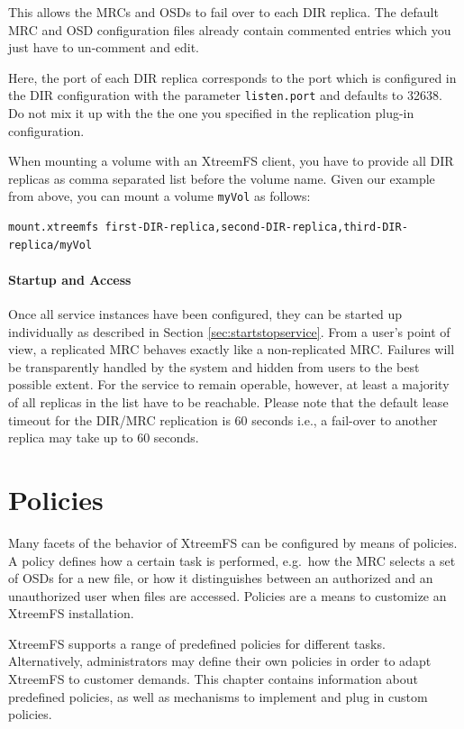 \documentclass[a4paper,10pt]{book}
\begin{document}
This allows the MRCs and OSDs to fail over to each DIR replica. The default MRC and OSD configuration files already contain commented entries which you just have to un-comment and edit.

Here, the port of each DIR replica corresponds to the port which is configured in the DIR configuration with the parameter \texttt{listen.port} and defaults to 32638. Do not mix it up with the the one you specified in the replication plug-in configuration.

When mounting a volume with an XtreemFS client, you have to provide all DIR replicas as comma separated list before the volume name. Given our example from above, you can mount a volume \texttt{myVol} as follows:

\begin{verbatim}
mount.xtreemfs first-DIR-replica,second-DIR-replica,third-DIR-replica/myVol
\end{verbatim}

\subsubsection{Startup and Access}
Once all service instances have been configured, they can be started up individually as described in Section \ref{sec:startstopservice}. From a user's point of view, a replicated MRC behaves exactly like a non-replicated MRC. Failures will be transparently handled by the system and hidden from users to the best possible extent. For the service to remain operable, however, at least a majority of all replicas in the list have to be reachable. Please note that the default lease timeout for the DIR/MRC replication is 60 seconds i.e., a fail-over to another replica may take up to 60 seconds.


\chapter{Policies} \label{chap:policies}
Many facets of the behavior of XtreemFS can be configured by means of policies. A policy defines how a certain task is performed, e.g.\ how the MRC selects a set of OSDs for a new file, or how it distinguishes between an authorized and an unauthorized user when files are accessed. Policies are a means to customize an XtreemFS installation.

XtreemFS supports a range of predefined policies for different tasks. Alternatively, administrators may define their own policies in order to adapt XtreemFS to customer demands. This chapter contains information about predefined policies, as well as mechanisms to implement and plug in custom policies.
\end{document}
